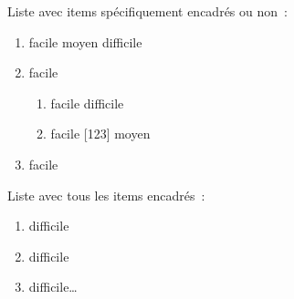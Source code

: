 \documentclass{article}
\newcommand*\circled[1]{\tikz[baseline=(char.base)]{
            \node[shape=circle,draw,inner sep=2pt] (char) {#1};}}
\newcommand{\sqitem}{\fitem{\fbox}}
\newcommand{\sqenumi}{\protect\fbox{\arabic*}}
\newcommand{\clitem}{\fitem{\circled}}
\begin{document}
Liste avec items spécifiquement encadrés ou non~:
\begin{enumerate}
  \item facile
  \clitem moyen
  \sqitem difficile
  \item facile
  \begin{enumerate}
    \item facile
    \sqitem difficile
    \item facile
    \clitem[123] moyen
  \end{enumerate}
  \item facile
\end{enumerate}

Liste avec tous les items encadrés~:
\begin{enumerate}[label=\sqenumi]
  \item difficile
  \item difficile
  \item difficile…
\end{enumerate}
\end{document}

